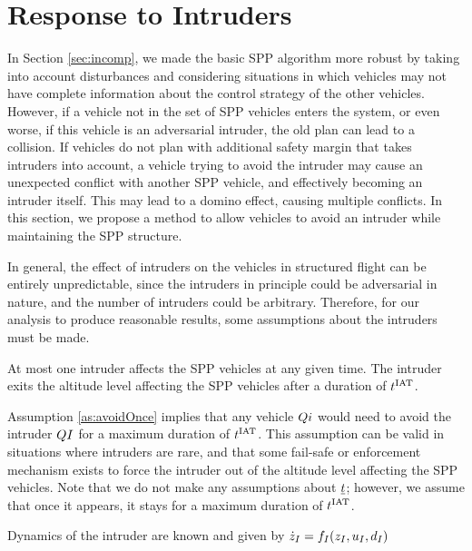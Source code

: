 \section{Response to Intruders \label{sec:intruder}}
In Section \ref{sec:incomp}, we made the basic SPP algorithm more robust by taking into account disturbances and considering situations in which vehicles may not have complete information about the control strategy of the other vehicles. However, if a vehicle not in the set of SPP vehicles enters the system, or even worse, if this vehicle is an adversarial intruder, the old plan can lead to a collision. If vehicles do not plan with additional safety margin that takes intruders into account, a vehicle trying to avoid the intruder may cause an unexpected conflict with another SPP vehicle, and effectively becoming an intruder itself. This may lead to a domino effect, causing multiple conflicts. In this section, we propose a method to allow vehicles to avoid an intruder while maintaining the SPP structure.

In general, the effect of intruders on the vehicles in structured flight can be entirely unpredictable, since the intruders in principle could be adversarial in nature, and the number of intruders could be arbitrary. Therefore, for our analysis to produce reasonable results, some assumptions about the intruders must be made.

\begin{assumption}
\label{as:avoidOnce}
At most one intruder affects the SPP vehicles at any given time. The intruder exits the altitude level affecting the SPP vehicles after a duration of $t^\text{IAT}$.
\end{assumption}

Assumption \ref{as:avoidOnce} implies that any vehicle $Q{i}$ would need to avoid the intruder $Q{I}$ for a maximum duration of $t^\text{IAT}$. This assumption can be valid in situations where intruders are rare, and that some fail-safe or enforcement mechanism exists to force the intruder out of the altitude level affecting the SPP vehicles. Note that we do not make any assumptions about $\underline{t}$; however, we assume that once it appears, it stays for a maximum duration of $t^\text{IAT}$.

\begin{assumption}
\label{as:dynKnown}
Dynamics of the intruder are known and given by $\dot{z}_I = f_I(z_I, u_I, d_I)$
\end{assumption}

